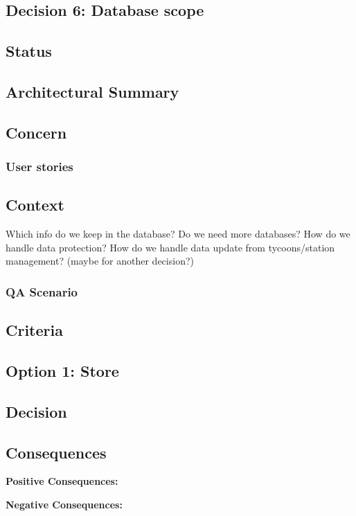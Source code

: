 \subsection{Decision 6: Database scope}

\subsection*{Status}

\subsection*{Architectural Summary}


\subsection*{Concern}
\subsubsection*{User stories}

\subsection*{Context}
Which info do we keep in the database? 
Do we need more databases?
How do we handle data protection?
How do we handle data update from tycoons/station management? (maybe for another decision?)

\subsubsection*{QA Scenario} %
\subsection*{Criteria}
\begin{itemize}
\end{itemize}

\subsection*{Option 1: Store }

\subsection*{Decision}

\subsection*{Consequences}
\textbf{Positive Consequences:}
\begin{itemize}
\end{itemize}
\textbf{Negative Consequences:}
\begin{itemize}
\end{itemize}